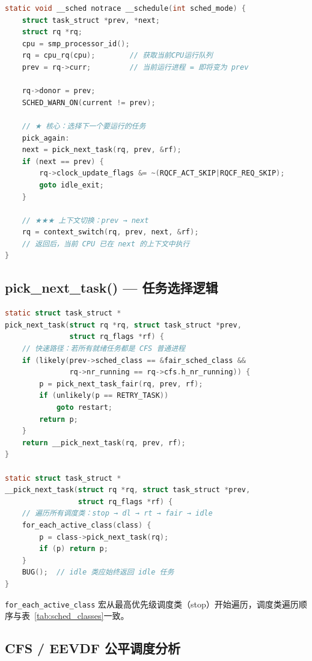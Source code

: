 \documentclass[a4paper]{article}
\newcommand{\tabref}[1]{表~\ref{#1}}
\begin{document}
\begin{lstlisting}[language=C, caption={\_\_schedule() 核心流程（kernel/sched/core.c）}, label={lst:__schedule}]
static void __sched notrace __schedule(int sched_mode) {
    struct task_struct *prev, *next;
    struct rq *rq;
    cpu = smp_processor_id();
    rq = cpu_rq(cpu);        // 获取当前CPU运行队列
    prev = rq->curr;         // 当前运行进程 = 即将变为 prev

    rq->donor = prev;
    SCHED_WARN_ON(current != prev);

    // ★ 核心：选择下一个要运行的任务
    pick_again:
    next = pick_next_task(rq, prev, &rf);
    if (next == prev) {
        rq->clock_update_flags &= ~(RQCF_ACT_SKIP|RQCF_REQ_SKIP);
        goto idle_exit;
    }

    // ★★★ 上下文切换：prev → next
    rq = context_switch(rq, prev, next, &rf);
    // 返回后，当前 CPU 已在 next 的上下文中执行
}
\end{lstlisting}

\subsection{pick\_next\_task() — 任务选择逻辑}

\begin{lstlisting}[language=C, caption={pick\_next\_task 与 \_\_pick\_next\_task（kernel/sched/core.c）}, label={lst:pick_next}]
static struct task_struct *
pick_next_task(struct rq *rq, struct task_struct *prev,
               struct rq_flags *rf) {
    // 快速路径：若所有就绪任务都是 CFS 普通进程
    if (likely(prev->sched_class == &fair_sched_class &&
               rq->nr_running == rq->cfs.h_nr_running)) {
        p = pick_next_task_fair(rq, prev, rf);
        if (unlikely(p == RETRY_TASK))
            goto restart;
        return p;
    }
    return __pick_next_task(rq, prev, rf);
}

static struct task_struct *
__pick_next_task(struct rq *rq, struct task_struct *prev,
                 struct rq_flags *rf) {
    // 遍历所有调度类：stop → dl → rt → fair → idle
    for_each_active_class(class) {
        p = class->pick_next_task(rq);
        if (p) return p;
    }
    BUG();  // idle 类应始终返回 idle 任务
}
\end{lstlisting}

\texttt{for\_each\_active\_class} 宏从最高优先级调度类（stop）开始遍历，调度类遍历顺序与\tabref{tab:sched_classes}一致\cite{sched_cfs}。

\subsection{CFS / EEVDF 公平调度分析}
\end{document}
